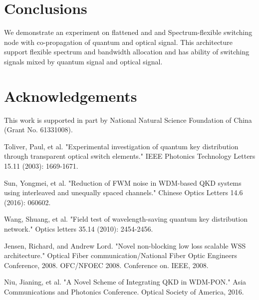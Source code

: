 \documentclass[letterpaper,10pt]{article}
\begin{document}
\section{Conclusions}
We demonstrate an experiment on flattened and  and Spectrum-flexible switching node with co-propagation of quantum and optical signal. This architecture support flexible spectrum and bandwidth allocation and has ability of switching signals mixed by quantum signal and optical signal.

\section{Acknowledgements}
This work is supported in part by National Natural Science Foundation of China (Grant No. 61331008).


\begin{thebibliography}{99}

 Toliver, Paul, et al. "Experimental investigation of quantum key distribution through transparent optical switch elements." IEEE Photonics Technology Letters 15.11 (2003): 1669-1671.

 Sun, Yongmei, et al. "Reduction of FWM noise in WDM-based QKD systems using interleaved and unequally spaced channels." Chinese Optics Letters 14.6 (2016): 060602.

 Wang, Shuang, et al. "Field test of wavelength-saving quantum key distribution network." Optics letters 35.14 (2010): 2454-2456.

 Jensen, Richard, and Andrew Lord. "Novel non-blocking low loss scalable WSS architecture." Optical Fiber communication/National Fiber Optic Engineers Conference, 2008. OFC/NFOEC 2008. Conference on. IEEE, 2008.

 Niu, Jianing, et al. "A Novel Scheme of Integrating QKD in WDM-PON." Asia Communications and Photonics Conference. Optical Society of America, 2016.

\end{thebibliography}
\end{document}
